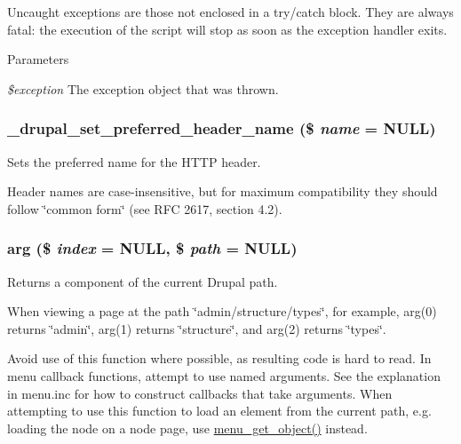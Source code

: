 Uncaught exceptions are those not enclosed in a try/catch block. They are always fatal: the execution of the script will stop as soon as the exception handler exits.


\begin{DoxyParams}{Parameters}
\item[{\em \$exception}]The exception object that was thrown. \end{DoxyParams}
\hypertarget{bootstrap_8inc_a5a8f423c6c77a609be5dc291e52470fb}{
\subsubsection[{\_\-drupal\_\-set\_\-preferred\_\-header\_\-name}]{\setlength{\rightskip}{0pt plus 5cm}\_\-drupal\_\-set\_\-preferred\_\-header\_\-name (\$ {\em name} = {\ttfamily NULL})}}
\label{bootstrap_8inc_a5a8f423c6c77a609be5dc291e52470fb}
Sets the preferred name for the HTTP header.

Header names are case-\/insensitive, but for maximum compatibility they should follow \char`\"{}common form\char`\"{} (see RFC 2617, section 4.2). \hypertarget{bootstrap_8inc_afd40bf1dc5dc1f68fb326a8f6e0b88da}{
\subsubsection[{arg}]{\setlength{\rightskip}{0pt plus 5cm}arg (\$ {\em index} = {\ttfamily NULL}, \/  \$ {\em path} = {\ttfamily NULL})}}
\label{bootstrap_8inc_afd40bf1dc5dc1f68fb326a8f6e0b88da}
Returns a component of the current Drupal path.

When viewing a page at the path \char`\"{}admin/structure/types\char`\"{}, for example, arg(0) returns \char`\"{}admin\char`\"{}, arg(1) returns \char`\"{}structure\char`\"{}, and arg(2) returns \char`\"{}types\char`\"{}.

Avoid use of this function where possible, as resulting code is hard to read. In menu callback functions, attempt to use named arguments. See the explanation in menu.inc for how to construct callbacks that take arguments. When attempting to use this function to load an element from the current path, e.g. loading the node on a node page, use \hyperlink{group__menu_ga8b1c8825ae7b6ae31b50cadaa1f7c920}{menu\_\-get\_\-object()} instead.


